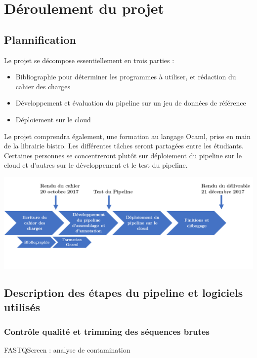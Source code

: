 \section{Déroulement du projet}


\subsection{Plannification}

Le projet se décompose essentiellement en trois parties : 

\begin{itemize}
\setlength{\itemindent}{.2in}
\item Bibliographie pour déterminer les programmes à utiliser, et rédaction du cahier des charges
\item Développement et évaluation du pipeline sur un jeu de données de référence
\item Déploiement sur le cloud
\end{itemize} 

Le projet comprendra également, une formation au langage Ocaml, prise en main de la librairie bistro. 
Les différentes tâches seront partagées entre les étudiants. Certaines personnes se concentreront plutôt sur déploiement du pipeline sur le cloud et d’autres sur le développement et le test du pipeline. 



 \includegraphics[width=170mm]{images/planning.png}


\subsection{Description des étapes du pipeline et logiciels utilisés}

\subsubsection{Contrôle qualité et trimming des séquences brutes}

\forceindent FASTQScreen : analyse de contamination


